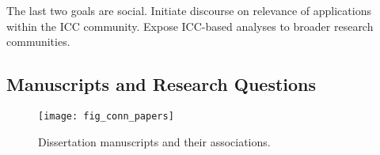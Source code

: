 The last two goals are social.
Initiate discourse on relevance of applications within the ICC community.
Expose ICC-based analyses to broader research communities.



\subsection{Manuscripts and Research Questions}
\label{subsec:conn-papers}

\begin{figure}[p]
\texttt{[image: fig\_conn\_papers]}\vspace{1em}
\caption[Dissertation manuscripts and their associations]
{Dissertation manuscripts and their associations.}
\label{fig:conn_papers}
\end{figure}

